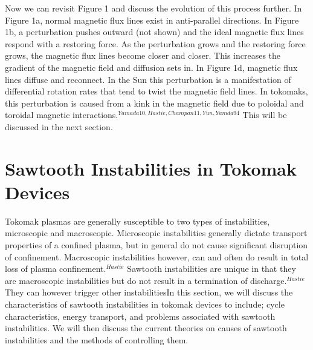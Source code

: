 \documentclass{article}
\begin{document}
Now we can revisit Figure 1 and discuss the evolution of this process further.  In Figure 1a, normal magnetic flux lines exist in anti-parallel directions.  In Figure 1b, a perturbation pushes outward (not shown) and the ideal magnetic flux lines respond with a restoring force.  As the perturbation grows and the restoring force grows, the magnetic flux lines become closer and closer.  This increases the gradient of the magnetic field and diffusion sets in.  In Figure 1d, magnetic flux lines diffuse and reconnect.  In the Sun this perturbation is a manifestation of differential rotation rates that tend to twist the magnetic field lines.  In tokomaks, this perturbation is caused from a kink in the magnetic field due to poloidal and toroidal magnetic interactions.$^{Yamada10,Hastie,Champan11,Yun,Yamda94}$  This will be discussed in the next section.
\section{Sawtooth Instabilities in Tokomak Devices}
Tokomak plasmas are generally susceptible to two types of instabilities, microscopic and macroscopic.  Microscopic instabilities generally dictate transport properties of a confined plasma, but in general do not cause significant disruption of confinement.  Macroscopic instabilities however, can and often do result in total loss of plasma confinement.$^{Hastie}$  Sawtooth instabilities are unique in that they are macroscopic instabilities but do not result in a termination of discharge.$^{Hastie}$  They can however trigger other instabilitiesIn this section, we will discuss the characteristics of sawtooth instabilities in tokomak devices to include; cycle characteristics, energy transport, and problems associated with sawtooth instabilities.  We will then discuss the current theories on causes of sawtooth instabilities and the methods of controlling them.
\end{document}
